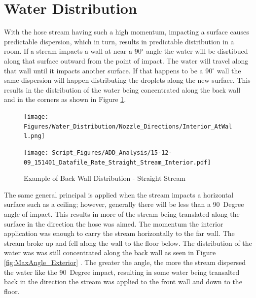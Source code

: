 \documentclass[12pt,oneside]{book}
\begin{document}
\section{Water Distribution}

With the hose stream having such a high momentum, impacting a surface causes predictable dispersion, which in turn, results in predictable distribution in a room. If a stream impacts a wall at near a 90$^{\circ}$ angle the water will be disrtibued along that surface outward from the point of impact. The water will travel along that wall until it impacts another surface. If that happens to be a 90$^{\circ}$ wall the same dispersion will happen distributing the droplets along the new surface. This results in the distribution of the water being concentrated along the back wall and in the corners as shown in Figure \ref{fig:Interior_Atwall_Example}.

\begin{figure}[H]
	\centering
	\begin{minipage}[b]{0.45\textwidth}
	\centering
	\texttt{[image: Figures/Water\_Distribution/Nozzle\_Directions/Interior\_AtWall.png]} 
	\end{minipage}
	\begin{minipage}[b]{0.45\textwidth}
	\centering
	\texttt{[image: Script\_Figures/ADD\_Analysis/15-12-09\_151401\_Datafile\_Rate\_Straight\_Stream\_Interior.pdf]}
	\end{minipage}
	\caption{Example of Back Wall Distribution - Straight Stream}
	\label{fig:Interior_Atwall_Example}
\end{figure}

The same general principal is applied when the stream impacts a horizontal surface such as a ceiling; however, generally there will be less than a 90~Degree angle of impact. This results in more of the stream being translated along the surface in the direction the hose was aimed. The momentum the interior application was enough to carry the stream horizontally to the far wall. The stream broke up and fell along the wall to the floor below. The distribution of the water was was still concentrated along the back wall as seen in Figure \ref{fig:MaxAngle_Exterior} . The greater the angle, the more the stream dispersed the water like the 90~Degree impact, resulting in some water being transalted back in the direction the stream was applied to the front wall and down to the floor.
\end{document}
